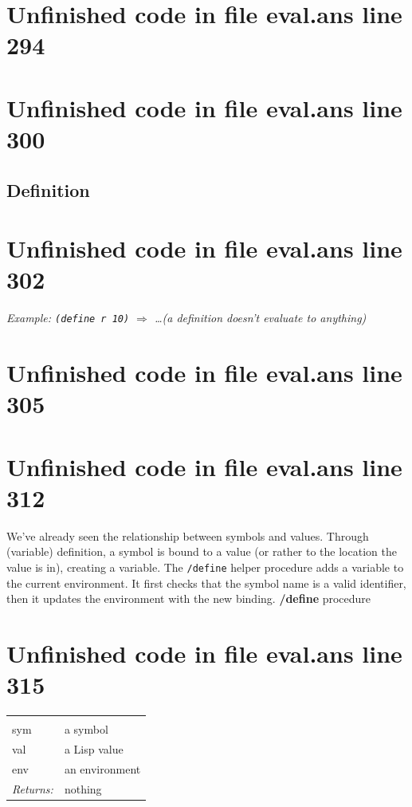 \documentclass[twoside,9pt]{report}
\begin{document}
\section{Unfinished code in file eval.ans line 294}
\section{Unfinished code in file eval.ans line 300}
\subsection{Definition}
\label{definition}
\section{Unfinished code in file eval.ans line 302}


\emph{Example: \texttt{(define r 10)} $\Rightarrow$ \ldots  (a definition doesn't evaluate to anything)}

\section{Unfinished code in file eval.ans line 305}
\section{Unfinished code in file eval.ans line 312}

We've already seen the relationship between symbols and values. Through (variable) definition, a symbol is bound to a value (or rather to the location the value is in), creating a variable. The \texttt{/define} helper procedure adds a variable to the current environment. It first checks that the symbol name is a valid identifier, then it updates the environment with the new binding. \textbf{/define} procedure

\section{Unfinished code in file eval.ans line 315}
\noindent\begin{tabular}{ |p{1.9cm} p{8cm}| }
\hline
\rowcolor[HTML]{CCCCCC} \multicolumn{2}{|l|}{\bf /define (internal)} \\
sym & a symbol \\
val & a Lisp value \\
env & an environment \\
\textit{Returns:} & nothing \\
\hline
\end{tabular}
\end{document}
